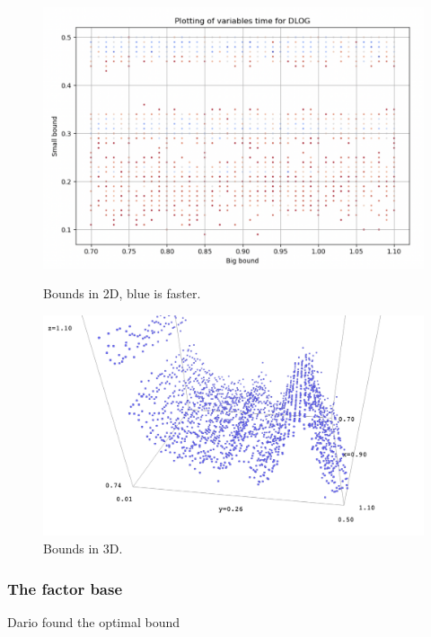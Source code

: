 \documentclass{article}
\theoremstyle{plain}
\theoremstyle{remark}
\theoremstyle{definition}
\begin{document}
\begin{figure}[!tbp]
  \centering
  \begin{minipage}[b]{0.5\textwidth}
    \includegraphics[width=\textwidth]{dlog_plot2d.png}
    \caption{Bounds in 2D, blue is faster.}
  \end{minipage}
  \hfill
  \begin{minipage}[b]{0.4\textwidth}
    \includegraphics[width=\textwidth]{dlog_plot3d.png}
    \caption{Bounds in 3D.}
  \end{minipage}
\end{figure}





\subsubsection{The factor base}\label{sssec:fact_base}
Dario found the optimal bound
\end{document}
